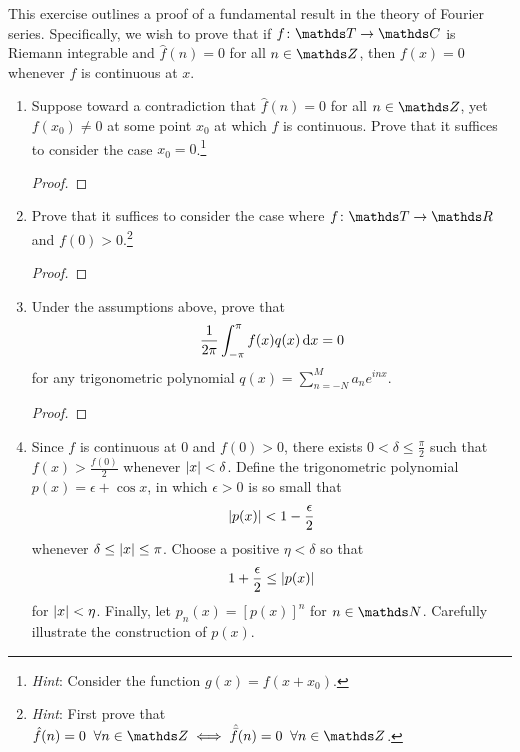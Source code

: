 \documentclass{../homework}
\author{}
\begin{document}
\begin{Exercise}
  This exercise outlines a proof of a fundamental result in the theory
  of Fourier series.  Specifically, we wish to prove that if
  \(f \colon \T \to \C\) is Riemann integrable and
  \(\widehat{f}(n) = 0\) for all \(n \in \Z\), then \(f(x) = 0\)
  whenever \(f\) is continuous at \(x\).
  \begin{enumerate}
  \item Suppose toward a contradiction that \(\hat f (n) = 0\) for all
    \(n \in \Z\), yet \(f(x_0) \neq 0\) at some point \(x_0\) at which
    \(f\) is continuous.  Prove that it suffices to consider the case
    \(x_0 = 0\).\footnote{\emph{Hint}: Consider the function
      \(g(x) = f(x+x_0)\).}

    \begin{solution}
      \begin{proof}

      \end{proof}
    \end{solution}

  \item Prove that it suffices to consider the case where
    \(f \colon \T \to \R\) and \(f(0) > 0\).\footnote{\emph{Hint}:
      First prove that
      \(\hat f (n) = 0 \;\; \forall n \in \Z \iff \hat{\bar f}(n) = 0
      \;\; \forall n \in \Z\).}

    \begin{solution}
      \begin{proof}

      \end{proof}
    \end{solution}

  \item Under the assumptions above, prove that
    \[
      \frac{1}{2\pi} \int_{-\pi}^{\pi} f(x) q(x) \mathop{}\! \mathrm d x = 0
    \]
    for any trigonometric polynomial
    \(q(x) = \sum_{n = -N}^M a_n e^{inx}\).

    \begin{solution}
      \begin{proof}

      \end{proof}
    \end{solution}

  \item Since \(f\) is continuous at \(0\) and \(f(0) > 0\), there
    exists \(0 < \delta \leq \frac{\pi}{2}\) such that
    \(f(x) > \frac{f(0)}{2}\) whenever \(\lvert {x} \rvert < \delta\).  Define
    the trigonometric polynomial \(p(x) = \epsilon + \cos x\), in
    which \(\epsilon > 0\) is so small that
    \begin{equation*}
      \lvert {p(x)} \rvert < 1 - \frac{\epsilon}{2}
    \end{equation*}
    whenever \(\delta \leq \lvert {x} \rvert \leq \pi\).  Choose a positive
    \(\eta < \delta\) so that
    \begin{equation*}
      1 + \frac{ \epsilon}{2} \leq \lvert {p(x)} \rvert
    \end{equation*}
    for \(\lvert {x} \rvert < \eta\).  Finally, let \(p_n(x) = [p(x)]^n\) for
    \(n \in \N\).  Carefully illustrate the construction of \(p(x)\).


\end{enumerate}
\end{Exercise}
\end{document}

